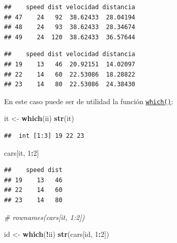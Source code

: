 \documentclass[]{book}
\newenvironment{Shaded}{\begin{snugshade}}{\end{snugshade}}
\newcommand{\KeywordTok}[1]{\textcolor[rgb]{0.13,0.29,0.53}{\textbf{#1}}}
\newcommand{\DecValTok}[1]{\textcolor[rgb]{0.00,0.00,0.81}{#1}}
\newcommand{\StringTok}[1]{\textcolor[rgb]{0.31,0.60,0.02}{#1}}
\newcommand{\CommentTok}[1]{\textcolor[rgb]{0.56,0.35,0.01}{\textit{#1}}}
\newcommand{\OperatorTok}[1]{\textcolor[rgb]{0.81,0.36,0.00}{\textbf{#1}}}
\newcommand{\NormalTok}[1]{#1}
\begin{document}
\begin{verbatim}
##    speed dist velocidad distancia
## 47    24   92  38.62433  28.04194
## 48    24   93  38.62433  28.34674
## 49    24  120  38.62433  36.57644
\end{verbatim}

\begin{Shaded}
\end{Shaded}

\begin{verbatim}
##    speed dist velocidad distancia
## 19    13   46  20.92151  14.02097
## 22    14   60  22.53086  18.28822
## 23    14   80  22.53086  24.38430
\end{verbatim}

En este caso puede ser de utilidad la función
\href{https://www.rdocumentation.org/packages/base/versions/3.6.1/topics/which}{\texttt{which()}}:

\begin{Shaded}
\begin{Highlighting}[]
\NormalTok{it <-}\StringTok{ }\KeywordTok{which}\NormalTok{(ii)}
\KeywordTok{str}\NormalTok{(it)}
\end{Highlighting}
\end{Shaded}

\begin{verbatim}
##  int [1:3] 19 22 23
\end{verbatim}

\begin{Shaded}
\begin{Highlighting}[]
\NormalTok{cars[it, }\DecValTok{1}\OperatorTok{:}\DecValTok{2}\NormalTok{]}
\end{Highlighting}
\end{Shaded}

\begin{verbatim}
##    speed dist
## 19    13   46
## 22    14   60
## 23    14   80
\end{verbatim}

\begin{Shaded}
\begin{Highlighting}[]
\CommentTok{# rownames(cars[it, 1:2])}

\NormalTok{id <-}\StringTok{ }\KeywordTok{which}\NormalTok{(}\OperatorTok{!}\NormalTok{ii)}
\KeywordTok{str}\NormalTok{(cars[id, }\DecValTok{1}\OperatorTok{:}\DecValTok{2}\NormalTok{])}
\end{Highlighting}
\end{Shaded}
\end{document}
